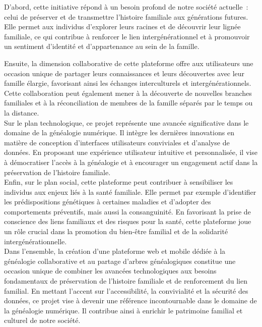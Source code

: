 D'abord, cette initiative répond à un besoin profond de notre société actuelle :
celui de préserver et de transmettre l’histoire familiale aux générations futures.
Elle permet aux individus d’explorer leurs racines et de découvrir leur lignée
familiale, ce qui contribue à renforcer le lien intergénérationnel et à promouvoir
un sentiment d’identité et d’appartenance au sein de la famille.

Ensuite, la dimension collaborative de cette plateforme offre aux utilisateurs une
occasion unique de partager leurs connaissances et leurs découvertes avec leur famille
élargie, favorisant ainsi les échanges interculturels et intergénérationnels.
Cette collaboration peut également mener à la découverte de nouvelles branches
familiales et à la réconciliation de membres de la famille séparés par le temps ou la distance. \\


Sur le plan technologique, ce projet représente une avancée significative dans le
domaine de la généalogie numérique. Il intègre les dernières innovations en
matière de conception d’interfaces utilisateurs conviviales et d’analyse de données.
En proposant une expérience utilisateur intuitive et personnalisée, il vise à
démocratiser l’accès à la généalogie et à encourager un engagement actif dans
la préservation de l’histoire familiale. \\


Enfin, sur le plan social, cette plateforme peut contribuer à sensibiliser les
individus aux enjeux liés à la santé familiale. Elle permet par exemple d’identifier
les prédispositions génétiques à certaines maladies et d’adopter des comportements
préventifs, mais aussi la consanguinité. En favorisant la prise de conscience des
liens familiaux et des risques pour la santé, cette plateforme joue un rôle crucial
dans la promotion du bien-être familial et de la solidarité intergénérationnelle. \\

Dans l’ensemble, la création d’une plateforme web et mobile dédiée à la généalogie
collaborative et au partage d’arbres généalogiques constitue une occasion unique
de combiner les avancées technologiques aux besoins fondamentaux de préservation
de l’histoire familiale et de renforcement du lien familial. En mettant l’accent
sur l’accessibilité, la convivialité et la sécurité des données, ce projet vise à
devenir une référence incontournable dans le domaine de la généalogie numérique.
Il contribue ainsi à enrichir le patrimoine familial et culturel de notre société. \\

